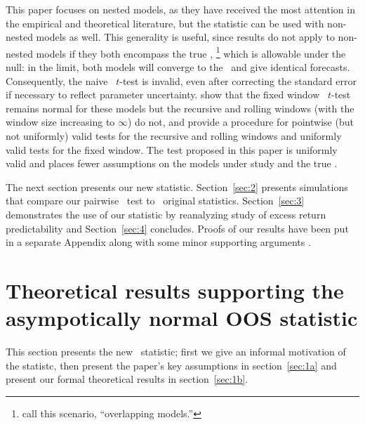 \documentclass[12pt,fleqn]{article}
\begin{document}
This paper focuses on nested models, as they have received the most
attention in the empirical and theoretical literature, but the
statistic can be used with non-nested models as well.  This generality
is useful, since  results do not apply to non-nested
models if they both encompass the true \dgp,%
\footnote{\citet{ClM:11b}
  call this scenario, ``overlapping models.''} %
which is allowable
under the null: in the limit, both models will converge to the \dgp\
and give identical forecasts.  Consequently, the naive \oos\ $t$-test
is invalid, even after correcting the standard error if necessary to
reflect parameter uncertainty.  \citet{ClM:11b} show that the fixed
window \oos\ $t$-test remains normal for these models but the
recursive and rolling windows (with the window size increasing to
$\infty$) do not, and provide a procedure for pointwise (but not
uniformly) valid tests for the recursive and rolling windows and
uniformly valid tests for the fixed window.  The test proposed in this
paper is uniformly valid and places fewer assumptions on the models
under study and the true \dgp.

The next section presents our new statistic. Section~\ref{sec:2} presents
simulations that compare our pairwise \oos\ test to \poscw\ original
statistics. Section~\ref{sec:3} demonstrates the use of our statistic
by reanalyzing \citepos{GoW:08} study of excess return
predictability and Section~\ref{sec:4} concludes. Proofs of
our results have been put in a separate Appendix along with
some minor supporting arguments \citep{Cal:14}.

\section{Theoretical results supporting the asympotically normal OOS statistic}
\label{sec:1}

This section presents the new \oos\ statistic; first we give an
informal motivation of the statistc, then present the paper's key
assumptions in section~\ref{sec:1a} and present our formal theoretical
results in section~\ref{sec:1b}.
\end{document}
